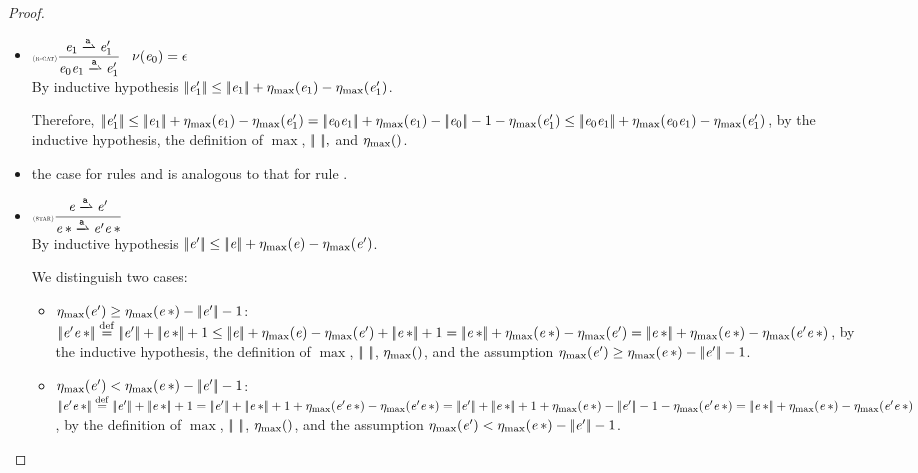 \begin{proof}
\begin{description}
\begin{itemize}
    \item $\Rule{r-cat}{\re_1\parDer{\sym}\re'_1}{\re_0\catop\re_1\parDer{\sym}\re'_1}{\hasEps{\re_0}=\eps}$\\[2ex]
          By inductive hypothesis ${{\mid\!\mid}}{\mathit {e}_1'}{{\mid\!\mid}}\leq {{\mid\!\mid}}{\ensuremath{\mathit {e}}_1}{{\mid\!\mid}}+{\eta_{\max}}({\mathit {e}_1})-{\eta_{\max}}({\mathit {e}'_1})$.

          Therefore, $\tsize{\re_1'}\leq \tsize{\re_1}+\incFunSize{\re_1}-\incFunSize{\re'_1}=\tsize{\re_0\catop\re_1}+\incFunSize{\re_1}-\tsize{\re_0}-1-\incFunSize{\re'_1}\leq\tsize{\re_0\catop\re_1}+\incFunSize{\re_0\catop\re_1}-\incFunSize{\re'_1}$, by the inductive hypothesis, the definition of $\max$, ${{\mid\!\mid}}{\ }{{\mid\!\mid}},$ and ${\eta_{\max}}({})$.

    \item the case for rules  and  is analogous to that for rule .
    \item $\Rule{star}{\re\parDer{\sym}\re'}{\starop{\re}\parDer{\sym}\re'\catop\starop{\re}}{}$\\[2ex]
          By inductive hypothesis ${{\mid\!\mid}}{\mathit {e}'}{{\mid\!\mid}}\leq {{\mid\!\mid}}{\ensuremath{\mathit {e}}}{{\mid\!\mid}}+{\eta_{\max}}({\mathit {e}})-{\eta_{\max}}({\mathit {e}'})$.

          We distinguish two cases:
          \begin{itemize}
           \item ${\eta_{\max}}({\mathit {e}'})\geq{\eta_{\max}}({{{\mathit {e}}\mathop{*}}})-{{\mid\!\mid}}{\mathit {e}'}{{\mid\!\mid}}-1$:
                 $\tsize{\re'\catop\starop{\re}}\stackrel{\mathrm{def}}{=}\tsize{\re'}+\tsize{\starop{\re}}+1\leq\tsize{\re}+\incFunSize{\re}-\incFunSize{\re'}+\tsize{\starop{\re}}+1=\tsize{\starop{\re}}+\incFunSize{\starop{\re}}-\incFunSize{\re'}=\tsize{\starop{\re}}+\incFunSize{\starop{\re}}-\incFunSize{\re'\catop\starop{\re}}$, by the inductive hypothesis, the definition of $\max$, ${{\mid\!\mid}}{\ }{{\mid\!\mid}}$, ${\eta_{\max}}({})$, and the assumption ${\eta_{\max}}({\mathit {e}'})\geq{\eta_{\max}}({{{\mathit {e}}\mathop{*}}})-{{\mid\!\mid}}{\mathit {e}'}{{\mid\!\mid}}-1$.

           \item ${\eta_{\max}}({\mathit {e}'})<{\eta_{\max}}({{{\mathit {e}}\mathop{*}}})-{{\mid\!\mid}}{\mathit {e}'}{{\mid\!\mid}}-1$:
                 $\tsize{\re'\catop\starop{\re}}\stackrel{\mathrm{def}}{=}\tsize{\re'}+\tsize{\starop{\re}}+1=\tsize{\re'}+\tsize{\starop{\re}}+1+\incFunSize{\re'\catop\starop{\re}}-\incFunSize{\re'\catop\starop{\re}}=\tsize{\re'}+\tsize{\starop{\re}}+1+\incFunSize{\starop{\re}}-\tsize{\re'}-1-\incFunSize{\re'\catop\starop{\re}}=\tsize{\starop{\re}}+\incFunSize{\starop{\re}}-\incFunSize{\re'\catop\starop{\re}}$, by the definition of $\max$, ${{\mid\!\mid}}{\ }{{\mid\!\mid}}$, ${\eta_{\max}}({})$, and the assumption ${\eta_{\max}}({\mathit {e}'})<{\eta_{\max}}({{{\mathit {e}}\mathop{*}}})-{{\mid\!\mid}}{\mathit {e}'}{{\mid\!\mid}}-1$.
          \end{itemize}
   \end{itemize}
 \end{description}
\end{proof}

